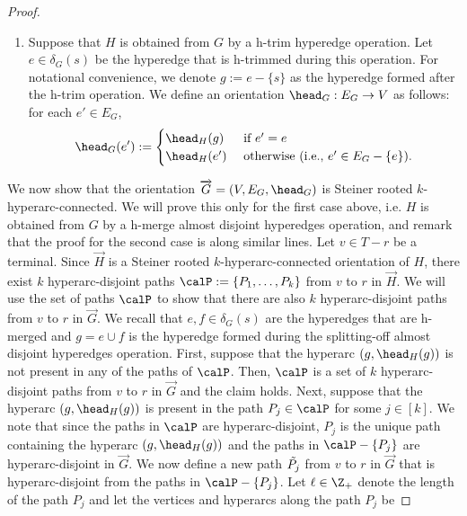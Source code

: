 \begin{proof}
\begin{enumerate}
    \item Suppose that $H$ is obtained from $G$ 
    by a h-trim hyperedge operation. Let $e \in \delta_{G}(s)$ be the hyperedge that is h-trimmed during this operation. For notational convenience, we denote $g:= e - \{s\}$ as the hyperedge formed after the h-trim operation. We define an orientation $\head_{G}:E_G\rightarrow V$ as follows: for each $e' \in E_G$,
$$\head_{G}(e') := \begin{cases}
    \head_{H}(g)& \text{ if } e' = e\\
    \head_{H}(e')& \text{ otherwise (i.e., $e'\in E_G-\{e\}$).}
\end{cases}$$  
\end{enumerate}
        We now show that the orientation $\overrightarrow{G} = (V, E_G, \head_G)$ is Steiner rooted $k$-hyperarc-connected. We will prove this only for the first case above, i.e. $H$ is obtained from $G$ by a h-merge almost disjoint hyperedges operation, and remark that the proof for the second case is along similar lines. Let $v \in T - r$ be a terminal. Since $\overrightarrow{H}$ is a Steiner rooted $k$-hyperarc-connected orientation of $H$, there exist $k$ hyperarc-disjoint paths $\calP := \{P_1, \ldots, P_k\}$ 
        from $v$ to $r$ 
        in $\overrightarrow{H}$. We will use the set of paths $\calP$ to show that there are also $k$ hyperarc-disjoint paths 
        from $v$ to $r$ 
        in $\overrightarrow{G}$. We recall that $e, f \in \delta_G(s)$ are the hyperedges that are h-merged and $g = e \cup f $ is the hyperedge formed during the splitting-off almost disjoint hyperedges operation. First, suppose that the hyperarc $(g, \head_H(g))$ is not present in any of the paths of $\calP$. Then, $\calP$ is a set of $k$ hyperarc-disjoint paths 
        from $v$ to $r$ 
        in $\overrightarrow{G}$ and the claim holds. Next, suppose that the hyperarc $(g, \head_H(g))$ is present in the path $P_j \in \calP$ for some $j \in [k]$. We note that since the paths in $\calP$ are hyperarc-disjoint, $P_j$ is the unique path containing the hyperarc $(g, \head_H(g))$ and the paths in $\calP - \{P_j\}$ are hyperarc-disjoint in $\overrightarrow{G}$. We now define a new path $\Tilde{P_j}$ 
        from $v$ to $r$ 
        in $\overrightarrow{G}$ that is hyperarc-disjoint from the paths in $\calP - \{P_j\}$. Let $\ell \in \Z_+$ denote the length of the path $P_j$ and let the vertices and hyperarcs along the path $P_j$ be 

\end{proof}
